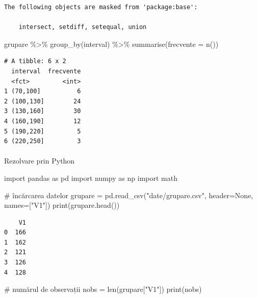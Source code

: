 \documentclass[
  11pt,
  b5paper,
  nottoc]{book}
\makeatletter
\let\oldparagraph\paragraph
\renewcommand{\paragraph}{
    \@ifstar
      \xxxParagraphStar
      \xxxParagraphNoStar
  }
\newcommand{\xxxParagraphStar}[1]{\oldparagraph*{#1}\mbox{}}
\newcommand{\xxxParagraphNoStar}[1]{\oldparagraph{#1}\mbox{}}
\newenvironment{Shaded}{\begin{snugshade}}{\end{snugshade}}
\newcommand{\AttributeTok}[1]{\textcolor[rgb]{0.40,0.45,0.13}{#1}}
\newcommand{\BuiltInTok}[1]{\textcolor[rgb]{0.00,0.23,0.31}{#1}}
\newcommand{\CommentTok}[1]{\textcolor[rgb]{0.37,0.37,0.37}{#1}}
\newcommand{\FunctionTok}[1]{\textcolor[rgb]{0.28,0.35,0.67}{#1}}
\newcommand{\ImportTok}[1]{\textcolor[rgb]{0.00,0.46,0.62}{#1}}
\newcommand{\NormalTok}[1]{\textcolor[rgb]{0.00,0.23,0.31}{#1}}
\newcommand{\OperatorTok}[1]{\textcolor[rgb]{0.37,0.37,0.37}{#1}}
\newcommand{\SpecialCharTok}[1]{\textcolor[rgb]{0.37,0.37,0.37}{#1}}
\newcommand{\StringTok}[1]{\textcolor[rgb]{0.13,0.47,0.30}{#1}}
\newcommand{\VariableTok}[1]{\textcolor[rgb]{0.07,0.07,0.07}{#1}}
\makeatother
\begin{document}
\begin{verbatim}
The following objects are masked from 'package:base':

    intersect, setdiff, setequal, union
\end{verbatim}

\begin{Shaded}
\begin{Highlighting}[]
\NormalTok{grupare }\SpecialCharTok{\%\textgreater{}\%} 
  \FunctionTok{group\_by}\NormalTok{(interval) }\SpecialCharTok{\%\textgreater{}\%}
  \FunctionTok{summarise}\NormalTok{(}\AttributeTok{frecvente =} \FunctionTok{n}\NormalTok{())}
\end{Highlighting}
\end{Shaded}

\begin{verbatim}
# A tibble: 6 x 2
  interval  frecvente
  <fct>         <int>
1 (70,100]          6
2 (100,130]        24
3 (130,160]        30
4 (160,190]        12
5 (190,220]         5
6 (220,250]         3
\end{verbatim}

\paragraph{Rezolvare prin Python}\label{rezolvare-prin-python-1}

\begin{Shaded}
\begin{Highlighting}[]
\ImportTok{import}\NormalTok{ pandas }\ImportTok{as}\NormalTok{ pd}
\ImportTok{import}\NormalTok{ numpy }\ImportTok{as}\NormalTok{ np}
\ImportTok{import}\NormalTok{ math}

\CommentTok{\# încărcarea datelor}
\NormalTok{grupare }\OperatorTok{=}\NormalTok{ pd.read\_csv(}\StringTok{"date/grupare.csv"}\NormalTok{, header}\OperatorTok{=}\VariableTok{None}\NormalTok{, names}\OperatorTok{=}\NormalTok{[}\StringTok{"V1"}\NormalTok{])}
\BuiltInTok{print}\NormalTok{(grupare.head())}
\end{Highlighting}
\end{Shaded}

\begin{verbatim}
    V1
0  166
1  162
2  121
3  126
4  128
\end{verbatim}

\begin{Shaded}
\begin{Highlighting}[]
\CommentTok{\# numărul de observații}
\NormalTok{nobs }\OperatorTok{=} \BuiltInTok{len}\NormalTok{(grupare[}\StringTok{"V1"}\NormalTok{])}
\BuiltInTok{print}\NormalTok{(nobs)}
\end{Highlighting}
\end{Shaded}
\end{document}
